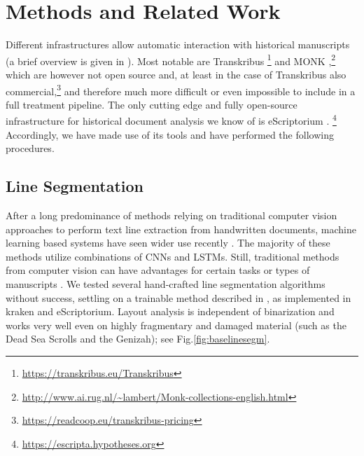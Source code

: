 \section{Methods and Related Work}

Different infrastructures allow automatic interaction with historical
manuscripts (a brief overview is given in \cite{KiesslingEtAl2019eScrip}).
Most notable are Transkribus
\cite{Kahle}\footnote{\url{https://transkribus.eu/Transkribus}} and MONK
\cite{schomaker2019lifelong},\footnote{\url{http://www.ai.rug.nl/~lambert/Monk-collections-english.html}}
which are however not open source and, at least in the case of Transkribus also
commercial,\footnote{\url{https://readcoop.eu/transkribus-pricing}} and
therefore much more difficult or even impossible to include in a full treatment
pipeline.  The only cutting edge and fully open-source infrastructure for
historical document analysis we know of is eScriptorium \cite{escript19}.%
\footnote{\url{https://escripta.hypotheses.org}}
Accordingly, we have made use of its tools and have performed the following
procedures.

\subsection{Line Segmentation} After a long predominance of methods relying on
traditional computer vision approaches to perform text line extraction from
handwritten documents, machine learning based systems have seen wider use
recently
\cite{KiesslingEtAl2019Badam,gruning2018read,fink2018baseline,diem2017cbad,KurarBarakat2018}.
The majority of these methods utilize combinations of CNNs and LSTMs. Still,
traditional methods from computer vision can have advantages for certain tasks
or types of manuscripts \cite{Viral,Seuret,StoeklLapinForthcoming}.  We tested
several hand-crafted line segmentation algorithms without success, settling on
a trainable method described in \cite{KiesslingEtAl2019Badam,
KiesslingStoekl2019}, as implemented in kraken \cite{Kraken} and eScriptorium.
Layout analysis is independent of binarization and works very well even on
highly fragmentary and damaged material (such as the Dead Sea Scrolls and the
Genizah); see Fig.\ref{fig:baselinesegm}.

